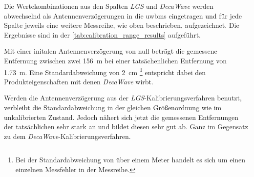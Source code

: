 Die Wertekombinationen aus den Spalten \textit{LGS} und \textit{DecaWave} werden abwechselnd als Antennenverzögerungen in die \Glspl{uwbm} eingetragen und für jede Spalte jeweils eine weitere Messreihe, wie oben beschrieben, aufgezeichnet. Die Ergebnisse sind in der \autoref{tab:calibration_range_results} aufgeführt.

Mit einer initalen Antennenverzögerung von null beträgt die gemessene Entfernung zwischen zwei  \approx \SI{156}{\meter} bei einer tatsächenlichen Entfernung von \approx \SI{1.73}{\meter}. Eine Standardabweichung von \approx \SI{2}{\centi\meter} \footnote{Bei der Standardabweichung von über einem Meter handelt es sich um einen einzelnen Messfehler in der Messreihe.} entspricht dabei den Produkteigenschaften mit denen \textit{DecaWave} wirbt.

Werden die Antennenverzögerung aus der \textit{LGS}-Kalibrierungsverfahren benutzt, verbleibt die Standardabweichung in der gleichen Größenordnung wie im unkalibrierten Zustand. Jedoch nähert sich jetzt die gemessenen Entfernungen der tatsächlichen sehr stark an und bildet diesen sehr gut ab. Ganz im Gegensatz zu dem \textit{DecaWave}-Ka\-li\-brierungs\-ver\-fahren.


